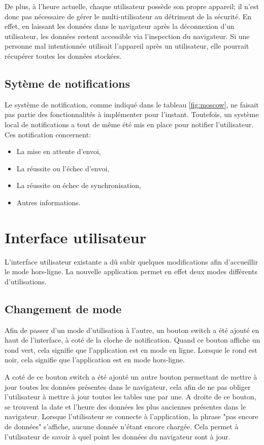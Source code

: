 \documentclass{EPL-master-thesis-covers-FR}
\begin{document}
				De plus, à l'heure actuelle, chaque utilisateur possède son propre appareil; il n'est donc pas nécessaire de gérer le multi-utilisateur au détriment de la sécurité. En effet, en laissant les données dans le navigateur après la déconnexion d'un utilisateur, les données restent accessible via l'inspection du navigateur. Si une personne mal intentionnée utilisait l'appareil après un utilisateur, elle pourrait récupérer toutes les données stockées. 
				
			\subsection*{Sytème de notifications}
				Le système de notification, comme indiqué dans le tableau \ref{fig:moscow}, ne faisait pas partie des fonctionnalités à implémenter pour l'instant. Toutefois, un système local de notifications a tout de même été mis en place pour notifier l'utilisateur. Ces notification concernent:
				
				\begin{itemize}[noitemsep]
					\item La mise en attente d'envoi,
					\item La réussite ou l'échec d'envoi,
					\item La réussite ou échec de synchronisation,
					\item Autres informations.
				\end{itemize}								
				
		
		\section{Interface utilisateur}
			L'interface utilisateur existante a dû subir quelques modifications afin d'accueillir le mode hors-ligne. La nouvelle application permet en effet deux modes différents d'utilisations.
			
			\subsection*{Changement de mode}
				Afin de passer d'un mode d'utilisation à l'autre, un bouton switch a été ajouté en haut de l'interface, à coté de la cloche de notification. Quand ce bouton affiche un rond vert, cela signifie que l'application est en mode en ligne. Lorsque le rond est noir, cela signifie que l'application est en mode hors-ligne.
				
				 A coté de ce bouton switch a été ajouté un autre bouton permettant de mettre à jour toutes les données présentes dans le navigateur, cela afin de ne pas obliger l'utilisateur à mettre à jour toutes les tables une par une. A droite de ce bouton, se trouvent la date et l'heure des données les plus anciennes présentes dans le navigateur. Lorsque l'utilisateur se connecte à l'application, la phrase "pas encore de données" s'affiche, aucune donnée n'étant encore chargée. Cela permet à l'utilisateur de savoir à quel point les données du navigateur sont à jour.
				
\end{document}
